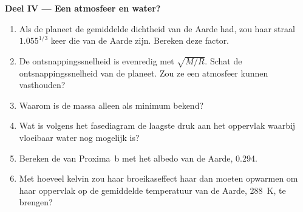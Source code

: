 \begin{problem}
\medskip
\noindent\textbf{Deel IV --- Een atmosfeer en water?}
\begin{enumerate}[resume]
  \item Als de planeet de gemiddelde dichtheid van de Aarde had, zou haar straal
        $1.055^{1/3}$ keer die van de Aarde zijn. Bereken deze factor.
  \item De ontsnappingssnelheid is evenredig met $\sqrt{M/R}$. Schat de
        ontsnappingssnelheid van de planeet. Zou ze een atmosfeer kunnen
        vasthouden?
  \item Waarom is de massa alleen als minimum bekend?
  \item Wat is volgens het fasediagram de laagste druk aan het oppervlak
        waarbij vloeibaar water nog mogelijk is?
  \item Bereken de  van Proxima~b met het albedo van de
        Aarde, 0.294.
  \item Met hoeveel kelvin zou haar broeikaseffect haar dan moeten opwarmen om
        haar oppervlak op de gemiddelde temperatuur van de Aarde,
        \qty{288}{K}, te brengen?
\end{enumerate}
\end{problem}
